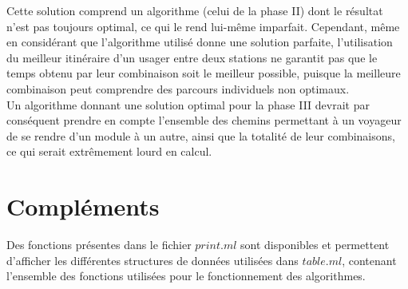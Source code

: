 \documentclass[11pt, a4paper, twoside, titlepage]{article}
\begin{document}
Cette solution comprend un algorithme (celui de la phase II) dont le résultat n'est pas toujours optimal, ce qui le rend lui-même imparfait. Cependant, même en considérant que l'algorithme utilisé donne une solution parfaite, l'utilisation du meilleur itinéraire d'un usager entre deux stations ne garantit pas que le temps obtenu par leur combinaison soit le meilleur possible, puisque la meilleure combinaison peut comprendre des parcours individuels non optimaux.\\
Un algorithme donnant une solution optimal pour la phase III devrait par conséquent prendre en compte l'ensemble des chemins permettant à un voyageur de se rendre d'un module à un autre, ainsi que la totalité de leur combinaisons, ce qui serait extrêmement lourd en calcul.\\


\section{Compléments}

Des fonctions présentes dans le fichier $print.ml$ sont disponibles et permettent d'afficher les différentes structures de données utilisées dans $table.ml$, contenant l'ensemble des fonctions utilisées pour le fonctionnement des algorithmes.\\
\end{document}
